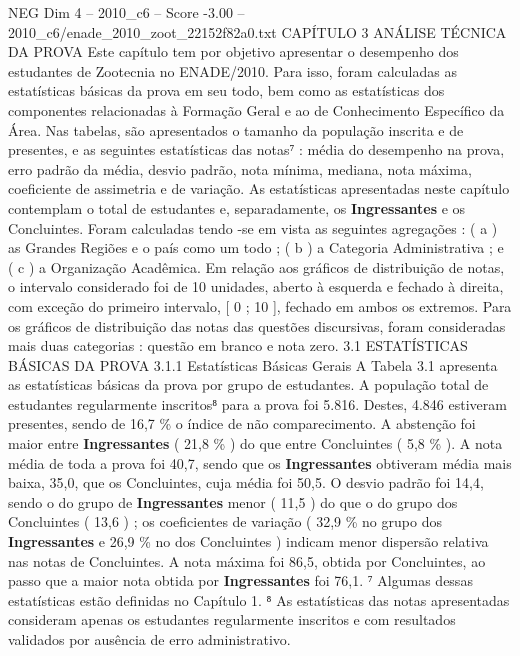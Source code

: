 \begin{textsample}{NEG Dim 4 – 2010\_c6 – Score -3.00 – 2010\_c6/enade\_2010\_zoot\_22152f82a0.txt}  \label{ex:f4_neg_042}
CAPÍTULO 3 ANÁLISE TÉCNICA DA PROVA Este capítulo tem por objetivo apresentar o desempenho dos estudantes de Zootecnia no ENADE/2010.
Para isso, foram calculadas as estatísticas básicas da prova em seu todo, bem como as estatísticas dos componentes relacionadas à Formação Geral e ao de Conhecimento Específico da Área.
Nas tabelas, são apresentados o tamanho da população inscrita e de presentes, e as seguintes estatísticas das notas⁷ : média do desempenho na prova, erro padrão da média, desvio padrão, nota mínima, mediana, nota máxima, coeficiente de assimetria e de variação.
As estatísticas apresentadas neste capítulo contemplam o total de estudantes e, separadamente, os \textbf{Ingressantes} e os Concluintes.
Foram calculadas tendo -se em vista as seguintes agregações : ( a ) as Grandes Regiões e o país como um todo ; ( b ) a Categoria Administrativa ; e ( c ) a Organização Acadêmica.
Em relação aos gráficos de distribuição de notas, o intervalo considerado foi de 10 unidades, aberto à esquerda e fechado à direita, com exceção do primeiro intervalo, [ 0 ; 10 ], fechado em ambos os extremos.
Para os gráficos de distribuição das notas das questões discursivas, foram consideradas mais duas categorias : questão em branco e nota zero. 3.1 ESTATÍSTICAS BÁSICAS DA PROVA 3.1.1 Estatísticas Básicas Gerais A Tabela 3.1 apresenta as estatísticas básicas da prova por grupo de estudantes.
A população total de estudantes regularmente inscritos⁸ para a prova foi 5.816.
Destes, 4.846 estiveram presentes, sendo de 16,7 \% o índice de não comparecimento.
A abstenção foi maior entre \textbf{Ingressantes} ( 21,8 \% ) do que entre Concluintes ( 5,8 \% ).
A nota média de toda a prova foi 40,7, sendo que os \textbf{Ingressantes} obtiveram média mais baixa, 35,0, que os Concluintes, cuja média foi 50,5.
O desvio padrão foi 14,4, sendo o do grupo de \textbf{Ingressantes} menor ( 11,5 ) do que o do grupo dos Concluintes ( 13,6 ) ; os coeficientes de variação ( 32,9 \% no grupo dos \textbf{Ingressantes} e 26,9 \% no dos Concluintes ) indicam menor dispersão relativa nas notas de Concluintes.
A nota máxima foi 86,5, obtida por Concluintes, ao passo que a maior nota obtida por \textbf{Ingressantes} foi 76,1. ⁷ Algumas dessas estatísticas estão definidas no Capítulo 1. ⁸ As estatísticas das notas apresentadas consideram apenas os estudantes regularmente inscritos e com resultados validados por ausência de erro administrativo.

\end{textsample}
